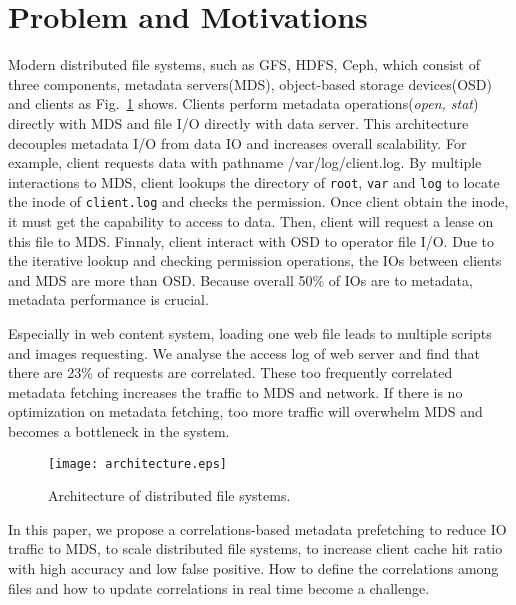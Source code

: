 \section{Problem and Motivations}

Modern distributed file systems, such as GFS\cite{ghemawat2003google}, HDFS\cite{shvachko2010hadoop}, Ceph\cite{weil2006ceph}, which consist of three components, metadata servers(MDS), object-based storage devices(OSD) and clients as Fig.~\ref{fig:architecture} shows. Clients perform metadata operations(\emph{open, stat}) directly with MDS and file I/O directly with data server. This architecture decouples metadata I/O from data IO and increases overall scalability. For example, client requests data with pathname /var/log/client.log. By multiple interactions to MDS, client lookups the directory of \texttt{root}, \texttt{var} and \texttt{log} to locate the inode of \texttt{client.log} and checks the permission. Once client obtain the inode, it must get the capability to access to data. Then, client will request a lease on this file to MDS. Finnaly, client interact with OSD to operator file I/O. Due to the iterative lookup and checking permission operations, the IOs between clients and MDS are more than OSD. Because overall 50\% of IOs are to metadata\cite{roselli2000comparison}, metadata performance is crucial.

Especially in web content system, loading one web file leads to multiple scripts and images requesting. We analyse the access log\cite{zhang2016composite} of web server and find that there are 23\% of requests are correlated. These too frequently correlated metadata fetching increases the traffic to MDS and network. If there is no optimization on metadata fetching, too more traffic will overwhelm MDS and becomes a bottleneck in the system.

\begin{figure}[htbp]
  \centering
  \texttt{[image: architecture.eps]}\\
  \caption{Architecture of distributed file systems.}\label{fig:architecture}
\end{figure}

In this paper, we propose a correlations-based metadata prefetching to reduce IO traffic to MDS, to scale distributed file systems, to increase client cache hit ratio with high accuracy and low false positive. How to define the correlations among files and how to update correlations in real time become a challenge.
